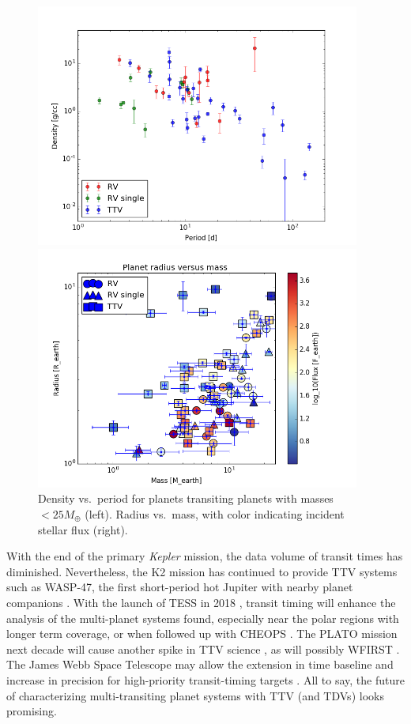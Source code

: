 \documentclass[graybox,natbib,nosecnum]{svmult}
\begin{document}
\begin{figure}
\centerline{
\includegraphics[width=0.95\textwidth]{density_vs_period_errors.png}}
\centerline{
\includegraphics[width=0.95\textwidth]{mass_radius_flux.png}}
\caption{Density vs.\ period for planets transiting planets with masses $<25 M_\oplus$ (left).  Radius
vs.\ mass, with color indicating incident stellar flux (right).}
\label{fig:density_period}
\end{figure}

With the end of the primary \emph{Kepler} mission, the data volume of transit times has diminished.
Nevertheless, the K2 mission has continued to provide TTV systems such as WASP-47, the first
short-period hot Jupiter with nearby planet companions \citep{2015Becker}.  With the launch
of TESS in 2018 \citep{2015JATIS...1a4003R}, transit timing will enhance the analysis 
of the multi-planet systems found, especially near the polar regions with longer term coverage, 
or when followed up with CHEOPS \citep{2014PASP..126.1134B}. 
The PLATO mission next decade will cause another spike in TTV science \citep{2014ExA....38..249R},
as will possibly WFIRST \citep{2017PASP..129d4401M}. The James Webb Space Telescope may allow the
extension in time baseline and increase in precision for high-priority transit-timing targets 
\citep{2014PASP..126.1134B}.  All to say, the future of characterizing multi-transiting planet
systems with TTV (and TDVs) looks promising.
\end{document}
